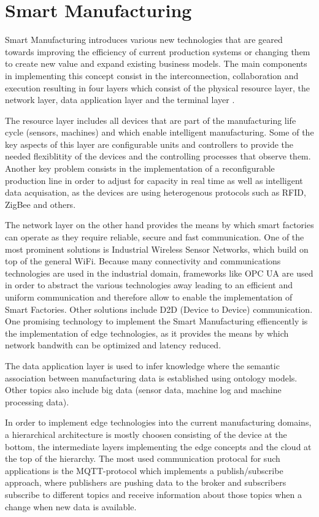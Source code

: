 \section{Smart Manufacturing}\label{sec:main}

Smart Manufacturing introduces various new technologies that are geared towards improving the efficiency of current production systems or changing them to create new value and expand existing business models. The main components in implementing this concept consist in the interconnection, collaboration and execution resulting in four layers which consist of the physical resource layer, the network layer, data application layer and the terminal layer \cite{chen2017smart}. 

The resource layer includes all devices that are part of the manufacturing life cycle (sensors, machines) and which enable intelligent manufacturing. Some of the key aspects of this layer are configurable units and controllers to provide the needed flexiblitity of the devices and the controlling processes that observe them. Another key problem consists in the implementation of  a reconfigurable production line in order to adjust for capacity in real time as well as intelligent data acquisation, as the devices are using heterogenous protocols such as RFID, ZigBee and others.

The network layer on the other hand provides the means by which smart factories can operate as they require reliable, secure and fast communication. One of the most prominent solutions is Industrial Wireless Sensor Networks, which build on top of the general WiFi. Because many connectivity and communications technologies are used in the industrial domain, frameworks like OPC UA are used in order to abstract the various technologies away leading to an efficient and uniform communication and therefore allow to enable the implementation of Smart Factories. Other solutions include D2D (Device to Device) communication. One promising technology to implement the Smart Manufacturing effiencently is the implementation of edge technologies, as it provides the means by which network bandwith can be optimized and latency reduced.

The data application layer is used to infer knowledge where the semantic association between manufacturing data is established using ontology models. Other topics also include big data (sensor data, machine log and machine processing data).

In order to implement edge technologies into the current manufacturing domains, a hierarchical architecture is mostly choosen consisting of the device at the bottom, the intermediate layers implementing the edge concepts and the cloud at the top of the hierarchy. The most used communication protocal for such applications is the MQTT-protocol which implements a publish/subscribe approach, where publishers are pushing data to the broker and subscribers subscribe to different topics and receive information about those topics when a change when new data is available.





